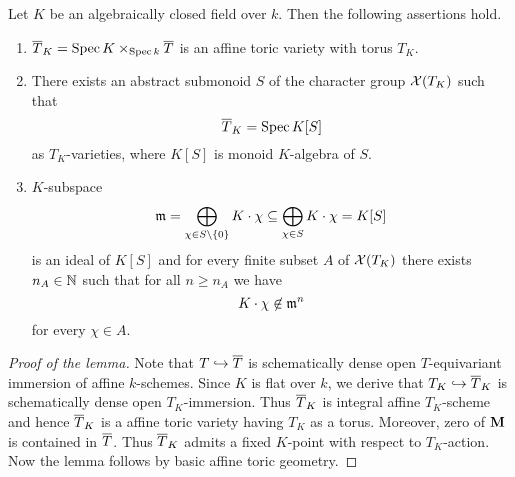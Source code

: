 \begin{lemma}\label{lemma:affine_toric_geometry_extracted}
Let $K$ be an algebraically closed field over $k$. Then the following assertions hold.
\begin{enumerate}[label=\emph{\textbf{(\arabic*)}}, leftmargin=1.5em]
\item $\overline{T}_K = \mathrm{Spec}\, K\times_{\mathrm{Spec}\, k}\overline{T}$ is an affine toric variety with torus $T_K$.
\item There exists an abstract submonoid $S$ of the character group ${\mathcal X}(T_K)$ such that
$$\overline{T}_K = \mathrm{Spec}\, K[S]$$
as $T_K$-varieties, where $K[S]$ is monoid $K$-algebra of $S$.
\item $K$-subspace
$$\mathfrak{m} = \bigoplus_{\chi \in S\setminus \{0\}}K \cdot \chi\subseteq \bigoplus_{\chi \in S}K \cdot \chi = K[S]$$
is an ideal of $K[S]$ and for every finite subset $A$ of ${\mathcal X}(T_K)$ there exists $n_A\in {\mathbb N}$ such that for all $n\geq n_A$ we have
$$K\cdot \chi \not \in \mathfrak{m}^{n}$$
for every $\chi \in A$.
\end{enumerate}
\end{lemma}
\begin{proof}[Proof of the lemma]
Note that $T\hookrightarrow \overline{T}$ is schematically dense open $T$-equivariant immersion of affine $k$-schemes. Since $K$ is flat over $k$, we derive that $T_K\hookrightarrow \overline{T}_K$ is schematically dense open $T_K$-immersion. Thus $\overline{T}_K$ is integral affine $T_K$-scheme and hence $\overline{T}_K$ is a affine toric variety having $T_K$ as a torus. Moreover, zero of $\mathbf{M}$ is contained in $\overline{T}$. Thus $\overline{T}_K$ admits a fixed $K$-point with respect to $T_K$-action. Now the lemma follows by basic affine toric geometry. 
\end{proof}

